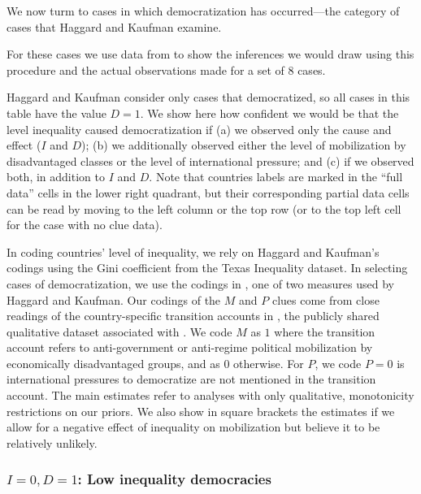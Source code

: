 \documentclass[
  12pt,
]{book}
\begin{document}
We now turm to cases in which democratization has occurred---the category of cases that Haggard and Kaufman examine.

For these cases we use data from \citet{haggard2012inequality} to show the inferences we would draw using this procedure and the actual observations made for a set of 8 cases.

Haggard and Kaufman consider only cases that democratized, so all cases in this table have the value \(D=1\). We show here how confident we would be that the level inequality caused democratization if (a) we observed only the cause and effect (\(I\) and \(D\)); (b) we additionally observed either the level of mobilization by disadvantaged classes or the level of international pressure; and (c) if we observed both, in addition to \(I\) and \(D\). Note that countries labels are marked in the ``full data'' cells in the lower right quadrant, but their corresponding partial data cells can be read by moving to the left column or the top row (or to the top left cell for the case with no clue data).

In coding countries' level of inequality, we rely on Haggard and Kaufman's codings using the Gini coefficient from the Texas Inequality dataset. In selecting cases of democratization, we use the codings in \citet{cheibub2010democracy}, one of two measures used by Haggard and Kaufman. Our codings of the \(M\) and \(P\) clues come from close readings of the country-specific transition accounts in \citet{haggard2012distributive}, the publicly shared qualitative dataset associated with \citet{haggard2012inequality}. We code \(M\) as \(1\) where the transition account refers to anti-government or anti-regime political mobilization by economically disadvantaged groups, and as \(0\) otherwise. For \(P\), we code \(P=0\) is international pressures to democratize are not mentioned in the transition account. The main estimates refer to analyses with only qualitative, monotonicity restrictions on our priors. We also show in square brackets the estimates if we allow for a negative effect of inequality on mobilization but believe it to be relatively unlikely.

\hypertarget{i0-d1-low-inequality-democracies}{%
\subsubsection{\texorpdfstring{\(I=0, D=1\): Low inequality democracies}{I=0, D=1: Low inequality democracies}}\label{i0-d1-low-inequality-democracies}}
\end{document}
